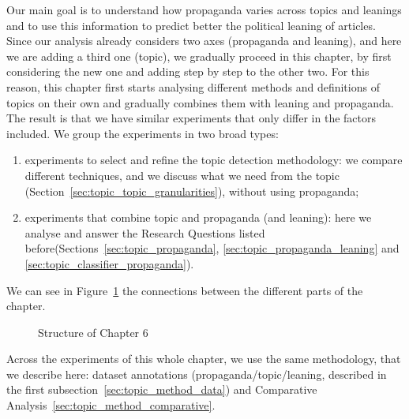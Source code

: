 Our main goal is to understand how propaganda varies across topics and leanings and to use this information to predict better the political leaning of articles.
Since our analysis already considers two axes (propaganda and leaning), and here we are adding a third one (topic), we gradually proceed in this chapter, by first considering the new one and adding step by step to the other two.
For this reason, this chapter first starts analysing different methods and definitions of topics on their own and gradually combines them with leaning and propaganda. The result is that we have similar experiments that only differ in the factors included.
We group the experiments in two broad types:
\begin{enumerate}
    \item experiments to select and refine the topic detection methodology: we compare different techniques, and we discuss what we need from the topic (Section~\ref{sec:topic_topic_granularities}), without using propaganda; 
    \item experiments that combine topic and propaganda (and leaning): here we analyse and answer the Research Questions listed before(Sections~\ref{sec:topic_propaganda}, \ref{sec:topic_propaganda_leaning} and \ref{sec:topic_classifier_propaganda}).
\end{enumerate}

We can see in Figure~\ref{fig:methodology_mindmap_chapter6} the connections between the different parts of the chapter.


\begin{figure}[!htbp]
    \centering
    \resizebox{\textwidth}{!}{
    \trimbox{2cm 1cm 2cm 1cm}{
    }}
    \caption{Structure of Chapter 6}
    \label{fig:methodology_mindmap_chapter6}
\end{figure}

Across the experiments of this whole chapter, we use the same methodology, that we describe here: dataset annotations (propaganda/topic/leaning, described in the first subsection~\ref{sec:topic_method_data}) and Comparative Analysis~\ref{sec:topic_method_comparative}.


